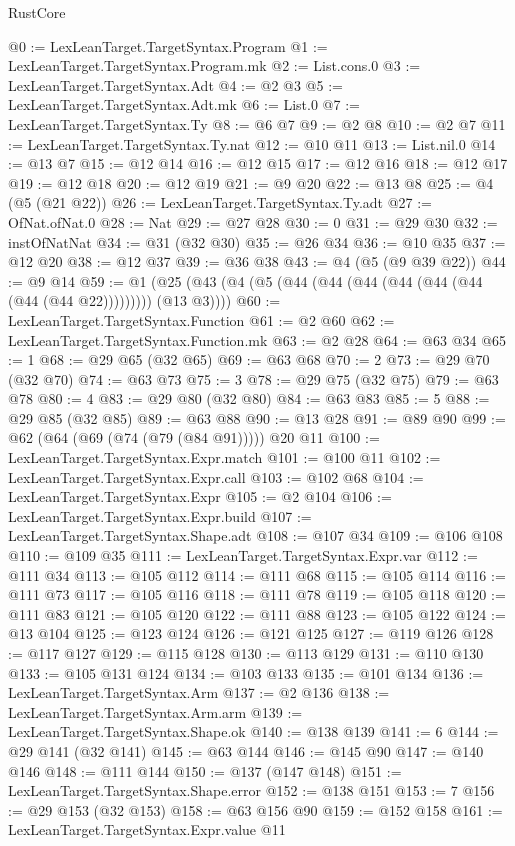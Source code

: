 \begin{lexlean}{RustCore}
\begin{coremodule}
@0 := LexLeanTarget.TargetSyntax.Program
@1 := LexLeanTarget.TargetSyntax.Program.mk
@2 := List.cons.{0}
@3 := LexLeanTarget.TargetSyntax.Adt
@4 := @2 @3
@5 := LexLeanTarget.TargetSyntax.Adt.mk
@6 := List.{0}
@7 := LexLeanTarget.TargetSyntax.Ty
@8 := @6 @7
@9 := @2 @8
@10 := @2 @7
@11 := LexLeanTarget.TargetSyntax.Ty.nat
@12 := @10 @11
@13 := List.nil.{0}
@14 := @13 @7
@15 := @12 @14
@16 := @12 @15
@17 := @12 @16
@18 := @12 @17
@19 := @12 @18
@20 := @12 @19
@21 := @9 @20
@22 := @13 @8
@25 := @4 (@5 (@21 @22))
@26 := LexLeanTarget.TargetSyntax.Ty.adt
@27 := OfNat.ofNat.{0}
@28 := Nat
@29 := @27 @28
@30 := 0
@31 := @29 @30
@32 := instOfNatNat
@34 := @31 (@32 @30)
@35 := @26 @34
@36 := @10 @35
@37 := @12 @20
@38 := @12 @37
@39 := @36 @38
@43 := @4 (@5 (@9 @39 @22))
@44 := @9 @14
@59 := @1 (@25 (@43 (@4 (@5 (@44 (@44 (@44 (@44 (@44 (@44 (@44 (@44 @22))))))))) (@13 @3))))
@60 := LexLeanTarget.TargetSyntax.Function
@61 := @2 @60
@62 := LexLeanTarget.TargetSyntax.Function.mk
@63 := @2 @28
@64 := @63 @34
@65 := 1
@68 := @29 @65 (@32 @65)
@69 := @63 @68
@70 := 2
@73 := @29 @70 (@32 @70)
@74 := @63 @73
@75 := 3
@78 := @29 @75 (@32 @75)
@79 := @63 @78
@80 := 4
@83 := @29 @80 (@32 @80)
@84 := @63 @83
@85 := 5
@88 := @29 @85 (@32 @85)
@89 := @63 @88
@90 := @13 @28
@91 := @89 @90
@99 := @62 (@64 (@69 (@74 (@79 (@84 @91))))) @20 @11
@100 := LexLeanTarget.TargetSyntax.Expr.match
@101 := @100 @11
@102 := LexLeanTarget.TargetSyntax.Expr.call
@103 := @102 @68
@104 := LexLeanTarget.TargetSyntax.Expr
@105 := @2 @104
@106 := LexLeanTarget.TargetSyntax.Expr.build
@107 := LexLeanTarget.TargetSyntax.Shape.adt
@108 := @107 @34
@109 := @106 @108
@110 := @109 @35
@111 := LexLeanTarget.TargetSyntax.Expr.var
@112 := @111 @34
@113 := @105 @112
@114 := @111 @68
@115 := @105 @114
@116 := @111 @73
@117 := @105 @116
@118 := @111 @78
@119 := @105 @118
@120 := @111 @83
@121 := @105 @120
@122 := @111 @88
@123 := @105 @122
@124 := @13 @104
@125 := @123 @124
@126 := @121 @125
@127 := @119 @126
@128 := @117 @127
@129 := @115 @128
@130 := @113 @129
@131 := @110 @130
@133 := @105 @131 @124
@134 := @103 @133
@135 := @101 @134
@136 := LexLeanTarget.TargetSyntax.Arm
@137 := @2 @136
@138 := LexLeanTarget.TargetSyntax.Arm.arm
@139 := LexLeanTarget.TargetSyntax.Shape.ok
@140 := @138 @139
@141 := 6
@144 := @29 @141 (@32 @141)
@145 := @63 @144
@146 := @145 @90
@147 := @140 @146
@148 := @111 @144
@150 := @137 (@147 @148)
@151 := LexLeanTarget.TargetSyntax.Shape.error
@152 := @138 @151
@153 := 7
@156 := @29 @153 (@32 @153)
@158 := @63 @156 @90
@159 := @152 @158
@161 := LexLeanTarget.TargetSyntax.Expr.value @11

\end{coremodule}
\end{lexlean}
